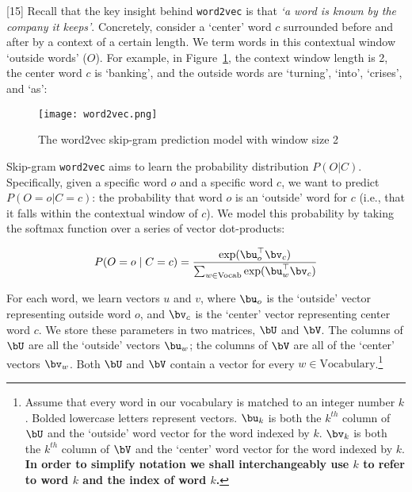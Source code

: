 [15]
Recall that the key insight behind {\tt word2vec} is that \textit{`a word is known by the company it keeps'}. Concretely, consider a `center' word $c$ surrounded before and after by a context of a certain length. We term words in this contextual window `outside words' ($O$). For example, in Figure~\ref{fig:word2vec}, the context window length is 2, the center word $c$ is `banking', and the outside words are `turning', `into', `crises', and `as':

\begin{figure}[h]
    \centering
    \texttt{[image: word2vec.png]}
    \caption{The word2vec skip-gram prediction model with window size 2}
    \label{fig:word2vec}
\end{figure}

Skip-gram {\tt word2vec} aims to learn the probability distribution $P(O|C)$. 
Specifically, given a specific word $o$ and a specific word $c$, we want to predict $P(O=o|C=c)$: the probability that word $o$ is an `outside' word for $c$ (i.e., that it falls within the contextual window of $c$).
We model this probability by taking the softmax function over a series of vector dot-products: %

\begin{equation}
 P(O=o \mid C=c) = \frac{\exp(\bu_{o}^\top \bv_c)}{\sum_{w \in \text{Vocab}} \exp(\bu_{w}^\top \bv_c)}
 \label{word2vec_condprob}
\end{equation}

For each word, we learn vectors $u$ and $v$, where $\bu_o$ is the `outside' vector representing outside word $o$, and $\bv_c$ is the `center' vector representing center word $c$. 
We store these parameters in two matrices, $\bU$ and $\bV$.
The columns of $\bU$ are all the `outside' vectors $\bu_{w}$;
the columns of $\bV$ are all of the `center' vectors $\bv_{w}$. 
Both $\bU$ and $\bV$ contain a vector for every $w \in \text{Vocabulary}$.\footnote{Assume that every word in our vocabulary is matched to an integer number $k$. Bolded lowercase letters represent vectors. $\bu_{k}$ is both the $k^{th}$ column of $\bU$ and the `outside' word vector for the word indexed by $k$. $\bv_k$ is both the $k^{th}$ column of $\bV$ and the `center' word vector for the word indexed by $k$. \textbf{In order to simplify notation we shall interchangeably use $k$ to refer to word $k$ and the index of word $k$.}}\newline

